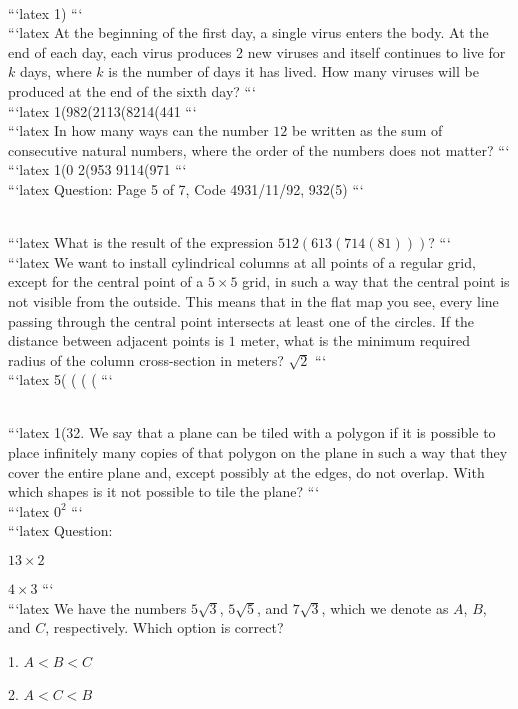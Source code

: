 \\
```latex
1)
```
\\
```latex
At the beginning of the first day, a single virus enters the body. At the end of each day, each virus produces 2 new viruses and itself continues to live for $k$ days, where $k$ is the number of days it has lived. How many viruses will be produced at the end of the sixth day?
```
\\
```latex
1(982(2113(8214(441
```
\\
```latex
In how many ways can the number $12$ be written as the sum of consecutive natural numbers, where the order of the numbers does not matter?
```
\\
```latex
1(0 2(953 9114(971
```
\\
```latex
Question: 
Page 5 of 7, Code 4931/11/92, 932(5)
```

\\
```latex
What is the result of the expression $512(613(714(81)))$?
```
\\
```latex
We want to install cylindrical columns at all points of a regular grid, except for the central point of a $5 \times 5$ grid, in such a way that the central point is not visible from the outside. This means that in the flat map you see, every line passing through the central point intersects at least one of the circles. If the distance between adjacent points is $1$ meter, what is the minimum required radius of the column cross-section in meters? $\sqrt{2}$
```
\\
```latex
5( ( ( ( 
```

\\
```latex
1(32. We say that a plane can be tiled with a polygon if it is possible to place infinitely many copies of that polygon on the plane in such a way that they cover the entire plane and, except possibly at the edges, do not overlap. With which shapes is it not possible to tile the plane?
```
\\
```latex
$0^2$
```
\\
```latex
Question: 

$13 \times 2$

$4 \times 3$
```
\\
```latex
We have the numbers $5\sqrt{3}$, $5\sqrt{5}$, and $7\sqrt{3}$, which we denote as $A$, $B$, and $C$, respectively. Which option is correct?

1. $A < B < C$

2. $A < C < B$

